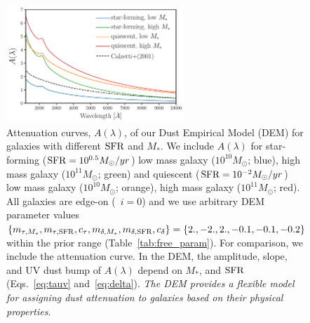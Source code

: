 \begin{figure}
\begin{center}
    \includegraphics[width=0.6\textwidth]{figs/dems.pdf}
    \caption{\label{fig:dem_av}
    Attenuation curves, $A(\lambda)$, of our Dust Empirical Model (DEM) for
    galaxies with different ${\rm SFR}$ and $M_*$. We include $A(\lambda)$ for 
    star-forming (${\rm SFR}=10^{0.5}M_\odot/yr$) low mass galaxy ($10^{10}M_\odot$;
    blue), high mass galaxy ($10^{11}M_\odot$; green) and quiescent
    (${\rm SFR}=10^{-2}M_\odot/yr$) low mass galaxy ($10^{10}M_\odot$; orange), 
    high mass galaxy ($10^{11}M_\odot$; red). All galaxies are edge-on
    (\ie~$i=0$) and we use arbitrary DEM parameter values $\{m_{\tau,M_*}, m_{\tau,{\rm SFR}}, c_\tau, m_{\delta,M_*}, m_{\delta,{\rm SFR}},
    c_\delta\} = \{2., -2., 2., -0.1, -0.1, -0.2\}$ within the prior range
    (Table~\ref{tab:free_param}). For comparison, we include the \cite{calzetti2001} 
    attenuation curve. In the DEM, the amplitude, slope, and UV dust bump of
    $A(\lambda)$ depend on $M_*$, and ${\rm SFR}$ (Eqs.~\ref{eq:tauv}
    and~\ref{eq:delta}). {\em The DEM provides a flexible model for
    assigning dust attenuation to galaxies based on their physical properties}.
    } 
\end{center}
\end{figure}



